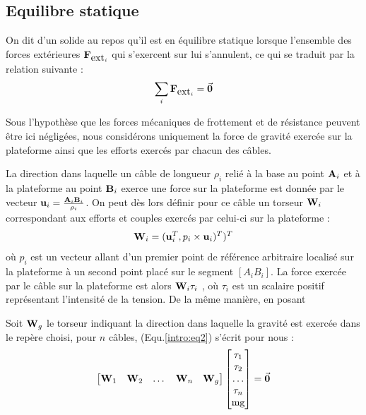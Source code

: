 \subsection{Equilibre statique}

On dit d'un solide au repos qu'il est en équilibre statique lorsque l'ensemble des forces extérieures $\mathcal {\bf F}_{\hbox{ext}_i}$ qui s'exercent sur lui s'annulent, ce qui se traduit par la relation suivante :
\begin{equation}
\sum_i \mathcal {\bf F}_{\hbox{ext}_i} = \vec {\bf 0}
\label{intro:eq2}
\end{equation}

Sous l'hypothèse que les forces mécaniques de frottement et de résistance peuvent être ici négligées, nous considérons uniquement la force de gravité exercée sur la plateforme ainsi que les efforts exercés par chacun des câbles.

La direction dans laquelle un câble de longueur $\rho_i$ relié à la base au point ${\bf A}_i$ et à la plateforme au point ${\bf B}_i$ exerce une force sur la plateforme est donnée par le vecteur ${\bf u}_i = \frac{{\bf A}_i{\bf B}_i}{\rho_i}$. On peut dès lors définir pour ce câble un torseur ${\bf W}_i$ correspondant aux efforts et couples exercés par celui-ci sur la plateforme :
\begin{equation}
{\bf W}_i = ({\bf u}_i^T, p_i \times {\bf u}_i)^T)^T
\label{intro:eq3}
\end{equation}
où $p_i$ est un vecteur allant d'un premier point de référence arbitraire localisé sur la plateforme à un second point placé sur le segment $[A_iB_i]$. La force exercée par le câble sur la plateforme est alors ${\bf W}_i \tau_i$ , où $\tau_i$ est un scalaire positif représentant l'intensité de la tension. De la même manière, en posant 


Soit ${\bf W}_g$ le torseur indiquant la direction dans laquelle la gravité est exercée dans le repère choisi, pour $n$ câbles, (Equ.\ref{intro:eq2}) s'écrit pour nous :
\begin{equation}
\begin{bmatrix}
 {\bf W}_1 & {\bf W}_2 & \dots & {\bf W}_n & {\bf W}_g
\end{bmatrix}
\begin{bmatrix}
 \tau_1 \\ \tau_2 \\ \dots \\ \tau_n \\ \hbox{mg}
\end{bmatrix}
= \vec {\bf 0}
\label{intro:eq4}
\end{equation}

